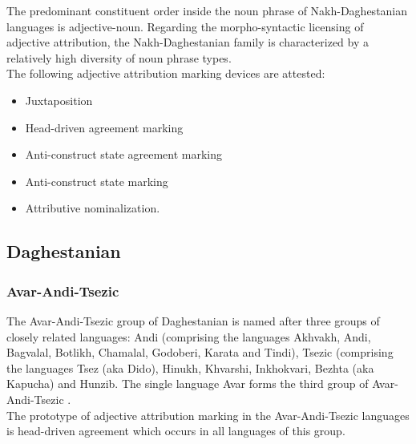 \noindent The predominant constituent order inside the noun phrase of Nakh-Daghestanian languages is adjective-noun. Regarding the morpho-syntactic licensing of adjective attribution, the Nakh-Daghestanian family is characterized by a relatively high diversity of noun phrase types.\\

\noindent The following adjective attribution marking devices are attested:
\begin{itemize}
\item Juxtaposition
\item Head-driven agreement marking
\item Anti-construct state agreement marking
\item Anti-construct state marking
\item Attributive nominalization.
\end{itemize}

\subsection{Daghestanian}
\subsubsection{Avar-Andi-Tsezic}
The Avar-Andi-Tsezic group of Daghestanian is named after three groups of closely related languages: Andi (comprising the languages Akhvakh, Andi, Bagvalal, Botlikh, Chamalal, Godoberi, Karata and Tindi), Tsezic (comprising the languages Tsez (aka Dido), Hinukh, Khvarshi, Inkhokvari, Bezhta (aka Kapucha) and Hunzib. The single language Avar forms the third group of Avar-Andi-Tsezic \citep[220, 233]{salminen2007}.\\

\noindent The prototype of adjective attribution marking in the Avar-Andi-Tsezic languages is head-driven agreement which occurs in all languages of this group.


